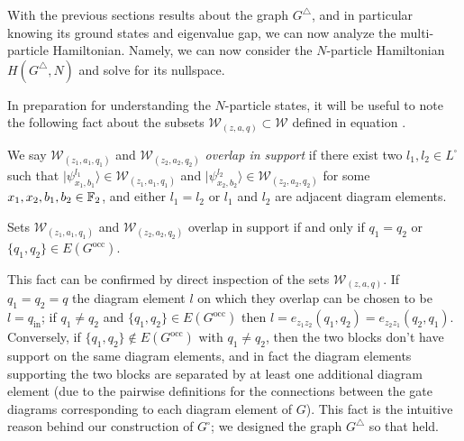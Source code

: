 \documentclass[../thesis-main/thesis-main]{subfiles}
\begin{document}
With the previous sections results about the graph $G^{\triangle}$, and in particular knowing its ground states and eigenvalue gap, we can now analyze the multi-particle Hamiltonian.  Namely, we can now consider the $N$-particle Hamiltonian $H(G^{\triangle},N)$ and solve for its nullspace. 

In preparation for understanding the $N$-particle states, it will be useful to note the following fact about the subsets $\mathcal{W}_{(z,a,q)}\subset\mathcal{W}$ defined in equation .
\begin{definition}
\label{defn:overlap_diagram_element}
  We say $\mathcal{W}_{(z_{1},a_{1},q_{1})}$ and $\mathcal{W}_{(z_{2},a_{2},q_{2})}$ \emph{overlap in support} if there exist two $l_1,l_2\in L^{\square}$ such that $|\psi_{x_{1},b_{1}}^{l_1}\rangle\in\mathcal{W}_{(z_{1},a_{1},q_{1})}$ and $|\psi_{x_{2},b_{2}}^{l_2}\rangle\in\mathcal{W}_{(z_{2},a_{2},q_{2})}$ for some $x_{1},x_{2},b_{1},b_{2}\in\mathbb{F}_2$, and either $l_1 = l_2$ or $l_1$ and $l_2$ are adjacent diagram elements.
\end{definition}

\begin{fact}
\label{fct:block_property}
Sets $\mathcal{W}_{(z_{1},a_{1},q_{1})}$ and $\mathcal{W}_{(z_{2},a_{2},q_{2})}$ overlap in support if and only if $q_{1}=q_{2}$ or $\{q_{1},q_{2}\}\in E(G^{\text{occ}})$.
\end{fact}
This fact can be confirmed by direct inspection of the sets $\mathcal{W}_{(z,a,q)}$. If $q_{1}=q_{2}=q$ the diagram element $l$ on which they overlap can be chosen to be $l=q_{\mathrm{in}}$; if $q_{1}\neq q_{2}$ and $\{q_{1},q_{2}\}\in E(G^{\text{occ}})$ then $l=e_{z_{1}z_{2}}(q_{1},q_{2})=e_{z_{2}z_{1}}(q_{2},q_{1})$.
Conversely, if $\{q_1,q_2\} \notin E(G^{\text{occ}})$ with $q_1 \ne q_2$, then the two blocks don't have support on the same diagram elements, and in fact the diagram elements supporting the two blocks are separated by at least one additional diagram element (due to the pairwise definitions for the connections between the gate diagrams corresponding to each diagram element of $G$).  This fact is the intuitive reason behind our construction of $G^\square$; we designed the graph $G^\triangle$ so that  held.
\end{document}

